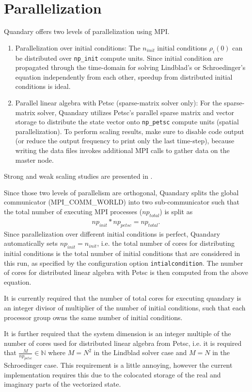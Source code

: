 \documentclass[11pt]{article}
\begin{document}
    \section{Parallelization}
    Quandary offers two levels of parallelization using MPI. 
    \begin{enumerate}
    \item Parallelization over initial conditions: The $n_{init}$ initial conditions $\rho_i(0)$ can be distributed over \texttt{np\_init} compute units. Since initial condition are propagated through the time-domain for solving Lindblad's or Schroedinger's equation independently from each other, speedup from distributed initial conditions is ideal. 
    \item Parallel linear algebra with Petsc (sparse-matrix solver only): For the sparse-matrix solver, Quandary utilizes Petsc's parallel sparse matrix and vector storage to distribute the state vector onto \texttt{np\_petsc} compute units (spatial parallelization). To perform scaling results, make sure to disable code output (or reduce the output frequency to print only the last time-step), because writing the data files invokes additional MPI calls to gather data on the master node.
    \end{enumerate}
    Strong and weak scaling studies are presented in \cite{guenther2021quantum}.

    Since those two levels of parallelism are orthogonal, Quandary splits the global communicator (MPI\_COMM\_WORLD) into
    two sub-communicator such that the total number of executing MPI
    processes ($np_{total}$) is split as
    \begin{align*}
      np_{init} * np_{petsc} = np_{total}.
    \end{align*}
    Since parallelization over different initial conditions is perfect, Quandary automatically sets $np_{init} = n_{init}$, i.e. the total number of cores for distributing initial conditions is the total number of initial conditions that are considered in this run, as specified by the configuration option \texttt{intialcondition}. The number of cores for distributed linear algebra with Petsc is then computed from the above equation.

    It is currently required that the number of total cores for executing quandary is an integer divisor of multiplier of the number of initial conditions, such that each processor group owns the same number of initial conditions. 
    
    It is further required that the system dimension is an integer multiple of the number of cores used for distributed linear algebra from Petsc, i.e. it is required that $\frac{M}{np_{petsc}} \in \mathds{N}$ where $M=N^2$ in the Lindblad solver case and $M=N$ in the Schroedinger case. This requirement is a little
      annoying, however the current implementation requires this due to the
      colocated storage of the real and imaginary parts of the vectorized
      state.
 
\end{document}
